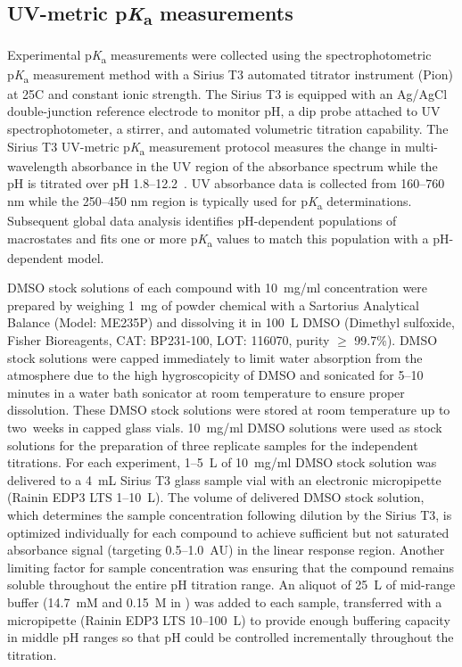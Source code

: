 \documentclass[9pt,lineno]{elife}
\newcommand{\pKa}{p\textit{K}\textsubscript{a}}
\begin{document}
\subsection{UV-metric \pKa{} measurements}

Experimental \pKa{} measurements were collected using the spectrophotometric \pKa{} measurement method with a Sirius T3 automated titrator instrument (Pion) at 25\textdegree{}C and constant ionic strength. 
The Sirius T3 is equipped with an Ag/AgCl double-junction reference electrode to monitor pH, a dip probe attached to UV spectrophotometer, a stirrer, and automated volumetric titration capability. 
The Sirius T3 UV-metric \pKa{} measurement protocol measures the change in multi-wavelength absorbance in the UV region of the absorbance spectrum while the pH is titrated over pH 1.8--12.2~\citep{tam_multi-wavelength_2001, allen_multiwavelength_1998}. 
UV absorbance data is collected from 160--760 nm while the 250--450 nm region is typically used for \pKa{} determinations.
Subsequent global data analysis identifies pH-dependent populations of macrostates and fits one or more \pKa{} values to match this population with a pH-dependent model.

DMSO stock solutions of each compound with 10~mg/ml concentration were prepared by weighing 1~mg of powder chemical with a Sartorius Analytical Balance (Model: ME235P) and dissolving it in 100~{\micro}L DMSO (Dimethyl sulfoxide, Fisher Bioreagents, CAT: BP231-100, LOT: 116070, purity $\geq$ 99.7\%).  
DMSO stock solutions were capped immediately to limit water absorption from the atmosphere due to the high hygroscopicity of DMSO and sonicated for 5--10 minutes in a water bath sonicator at room temperature to ensure proper dissolution. 
These DMSO stock solutions were stored at room temperature up to two~weeks in capped glass vials. 
10~mg/ml DMSO solutions were used as stock solutions for the preparation of three replicate samples for the independent titrations.  
For each experiment, 1--5~{\micro}L of 10~mg/ml DMSO stock solution was delivered to a 4~mL Sirius T3 glass sample vial with an electronic micropipette (Rainin EDP3 LTS 1--10~{\micro}L). 
The volume of delivered DMSO stock solution, which determines the sample concentration following dilution by the Sirius T3, is optimized individually for each compound to achieve sufficient but not saturated absorbance signal (targeting 0.5--1.0~AU) in the linear response region. 
Another limiting factor for sample concentration was ensuring that the compound remains soluble throughout the entire pH titration range. An aliquot of
25~{\micro}L of mid-range buffer (14.7~mM  and 0.15~M  in ) was added to each sample, transferred with a micropipette (Rainin EDP3 LTS 10--100~{\micro}L) to provide enough buffering capacity in middle pH ranges so that pH could be controlled incrementally throughout the titration.  
\end{document}
